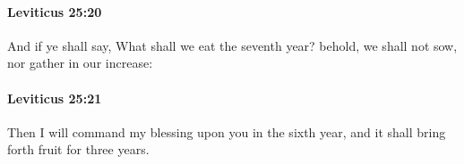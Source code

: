		\paragraph{Leviticus 25:20} %
			\label{LEVITICUS-25-20}

			And if ye shall say, What shall we eat the seventh year? behold, we shall not sow, nor gather in our increase:


		\paragraph{Leviticus 25:21} %
			\label{LEVITICUS-25-21}

			Then I will command my blessing upon you in the sixth year, and it shall bring forth fruit for three years.


